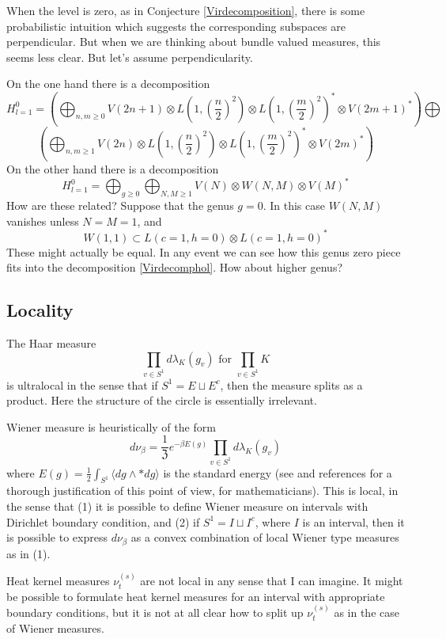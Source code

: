 \documentclass{amsart}
\theoremstyle{conjecture}
\theoremstyle{definition}
\theoremstyle{question}
\theoremstyle{questions}
\theoremstyle{remark}
\theoremstyle{remarks}
\theoremstyle{example}
\numberwithin{equation}{section}
\begin{document}
When the level is zero, as in Conjecture \ref{Virdecomposition}, there is some probabilistic intuition
which suggests the corresponding subspaces are perpendicular. But when we are thinking about bundle valued measures, this seems less clear. But let's assume perpendicularity.

On the one hand there is a decomposition
\begin{equation}\label{Virdecomphol}H^0_{l=1}=\left(\bigoplus_{n,m\ge 0}V(2n+1)\otimes L(1,(\frac n
2)^2)\otimes L(1,(\frac m2)^2)^{*}\otimes V(2m+1)^{*} \right)\bigoplus\end{equation}
$$\left(\bigoplus_{n,m\ge 1}V(2n)\otimes L(1,(\frac n
2)^2)\otimes L(1,(\frac m2)^2)^{*}\otimes V(2m)^{*}\right) $$
On the other hand there is a decomposition
$$H^0_{l=1}=\bigoplus_{g\ge 0}\bigoplus_{N,M\ge 1} V(N)\otimes  W(N,M) \otimes V(M)^*$$
How are these related?
Suppose that the genus $g=0$. In this case $W(N,M)$ vanishes unless $N=M=1$, and
$$W(1,1)\subset L(c=1,h=0)\otimes L(c=1,h=0)^* $$
These might actually be equal. In any event we can see how this genus zero piece fits into
the decomposition \ref{Virdecomphol}. How about higher genus?



\subsection{Locality}\label{locality}

The Haar measure
\begin{equation}\label{localmeas}\prod_{v\in S^1}d\lambda_K(g_v) \text{ for } \prod_{v\in S^1} K \end{equation}
is ultralocal in the sense that if $S^1=E\sqcup E^c$, then the measure splits
as a product. Here the structure of the circle is essentially irrelevant.

Wiener measure is heuristically of the form
$$d\nu_{\beta}=\frac{1}{\mathfrak Z}e^{-\beta E(g)}\prod_{v\in S^1}d\lambda_K(g_v)$$
where $E(g)=\frac{1}{2}\int_{S^1}\langle dg\wedge *dg\rangle$ is the standard energy
(see \cite{Driver2} and references for a thorough justification of this point of view, for mathematicians).
This is local, in the sense
that (1) it is possible to define Wiener measure on intervals with Dirichlet boundary condition,
and (2) if $S^1=I\sqcup I^c$, where $I$ is an interval, then it is possible to express $d\nu_{\beta}$
as a convex combination of local Wiener type measures as in (1).

Heat kernel measures $\nu^{(s)}_t$ are not local in any sense that I can imagine. It might be possible
to formulate heat kernel measures for an interval with appropriate boundary conditions, but it is not at all
clear how to split up $\nu^{(s)}_t$ as in the case of Wiener measures.
\end{document}
